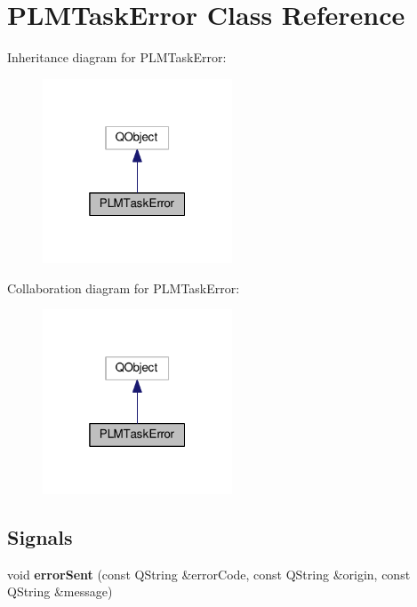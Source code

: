 \hypertarget{class_p_l_m_task_error}{}\section{P\+L\+M\+Task\+Error Class Reference}
\label{class_p_l_m_task_error}


Inheritance diagram for P\+L\+M\+Task\+Error\+:\nopagebreak
\begin{figure}[H]
\begin{center}
\leavevmode
\includegraphics[width=160pt]{class_p_l_m_task_error__inherit__graph}
\end{center}
\end{figure}


Collaboration diagram for P\+L\+M\+Task\+Error\+:\nopagebreak
\begin{figure}[H]
\begin{center}
\leavevmode
\includegraphics[width=160pt]{class_p_l_m_task_error__coll__graph}
\end{center}
\end{figure}
\subsection*{Signals}
\begin{DoxyCompactItemize}
\item 
void {\bfseries error\+Sent} (const Q\+String \&error\+Code, const Q\+String \&origin, const Q\+String \&message)\hypertarget{class_p_l_m_task_error_a802e611c3c002e3f113d852e02ac572f}{}\label{class_p_l_m_task_error_a802e611c3c002e3f113d852e02ac572f}

\end{DoxyCompactItemize}
